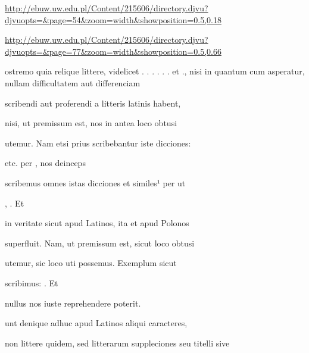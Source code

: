 
\newParkoszpage

{
\url{http://ebuw.uw.edu.pl/Content/215606/directory.djvu?djvuopts=&page=54&zoom=width&showposition=0.5,0.18}

\url{http://ebuw.uw.edu.pl/Content/215606/directory.djvu?djvuopts=&page=77&zoom=width&showposition=0.5,0.66}
}

\bigskip

\obeylines
\mono



\fullpreviouslines


{
\color{blue}

\indentP {}ostremo quia relique littere, videlicet
 . . . . .  .  et ., nisi in quantum cum
 asperatur, nullam difficultatem aut  differenciam

scribendi aut proferendi a litteris latinis habent,
}


\fulllines

nisi, ut premissum est, nos in antea  loco  obtusi

utemur. Nam etsi prius scribebantur iste dicciones:  

    etc. per , nos deinceps

scribemus omnes istas dicciones et similes¹ per  ut 

 ,    . Et

in veritate  sicut apud Latinos, ita et apud Polonos

superfluit. Nam, ut premissum est, sicut loco  obtusi

 utemur, sic loco   uti possemus. Exemplum sicut

scribimus:     . Et

nullus nos iuste reprehendere poterit.

unt denique adhuc apud Latinos aliqui caracteres,

non littere quidem, sed litterarum suppleciones seu titelli sive

